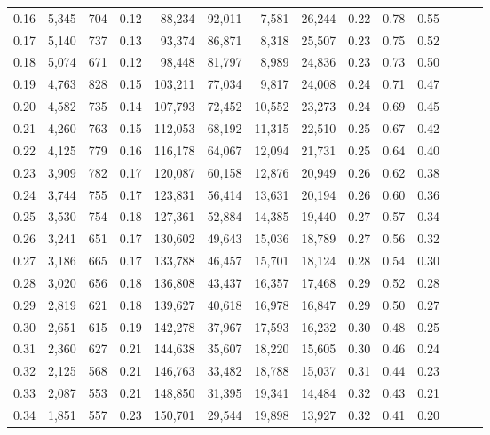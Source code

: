 \begin{tabular}{rrrrrrrrrrrrrr}
0.16 &  5,345 &  704 &  0.12 &   88,234 &   92,011 &   7,581 &  26,244 &  0.22 &  0.78 &      0.55 \\
0.17 &  5,140 &  737 &  0.13 &   93,374 &   86,871 &   8,318 &  25,507 &  0.23 &  0.75 &      0.52 \\
0.18 &  5,074 &  671 &  0.12 &   98,448 &   81,797 &   8,989 &  24,836 &  0.23 &  0.73 &      0.50 \\
0.19 &  4,763 &  828 &  0.15 &  103,211 &   77,034 &   9,817 &  24,008 &  0.24 &  0.71 &      0.47 \\
0.20 &  4,582 &  735 &  0.14 &  107,793 &   72,452 &  10,552 &  23,273 &  0.24 &  0.69 &      0.45 \\
0.21 &  4,260 &  763 &  0.15 &  112,053 &   68,192 &  11,315 &  22,510 &  0.25 &  0.67 &      0.42 \\
0.22 &  4,125 &  779 &  0.16 &  116,178 &   64,067 &  12,094 &  21,731 &  0.25 &  0.64 &      0.40 \\
0.23 &  3,909 &  782 &  0.17 &  120,087 &   60,158 &  12,876 &  20,949 &  0.26 &  0.62 &      0.38 \\
0.24 &  3,744 &  755 &  0.17 &  123,831 &   56,414 &  13,631 &  20,194 &  0.26 &  0.60 &      0.36 \\
0.25 &  3,530 &  754 &  0.18 &  127,361 &   52,884 &  14,385 &  19,440 &  0.27 &  0.57 &      0.34 \\
0.26 &  3,241 &  651 &  0.17 &  130,602 &   49,643 &  15,036 &  18,789 &  0.27 &  0.56 &      0.32 \\
0.27 &  3,186 &  665 &  0.17 &  133,788 &   46,457 &  15,701 &  18,124 &  0.28 &  0.54 &      0.30 \\
0.28 &  3,020 &  656 &  0.18 &  136,808 &   43,437 &  16,357 &  17,468 &  0.29 &  0.52 &      0.28 \\
0.29 &  2,819 &  621 &  0.18 &  139,627 &   40,618 &  16,978 &  16,847 &  0.29 &  0.50 &      0.27 \\
0.30 &  2,651 &  615 &  0.19 &  142,278 &   37,967 &  17,593 &  16,232 &  0.30 &  0.48 &      0.25 \\
0.31 &  2,360 &  627 &  0.21 &  144,638 &   35,607 &  18,220 &  15,605 &  0.30 &  0.46 &      0.24 \\
0.32 &  2,125 &  568 &  0.21 &  146,763 &   33,482 &  18,788 &  15,037 &  0.31 &  0.44 &      0.23 \\
0.33 &  2,087 &  553 &  0.21 &  148,850 &   31,395 &  19,341 &  14,484 &  0.32 &  0.43 &      0.21 \\
0.34 &  1,851 &  557 &  0.23 &  150,701 &   29,544 &  19,898 &  13,927 &  0.32 &  0.41 &      0.20 \\

\end{tabular}
